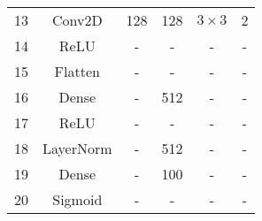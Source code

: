 \begin{table}[t]
{\begin{tabular}{cccccc}
13             & Conv2D              & 128                     & 128                      & $3 \times 3$         & 2               \\ 
14             & ReLU                & -                       & -                        & -                   & -               \\ 
15             & Flatten             & -                       & -                        & -                   & -               \\ 
16             & Dense               & -                       & 512                      & -                   & -               \\ 
17             & ReLU                & -                       & -                        & -                   & -               \\ 
18             & LayerNorm           & -                       & 512                      & -                   & -               \\ 
19             & Dense               & -                       & 100                      & -                   & -               \\ 
20             & Sigmoid             & -                       & -                        & -                   & -               \\ 
\bottomrule
\end{tabular}
}
\end{table}